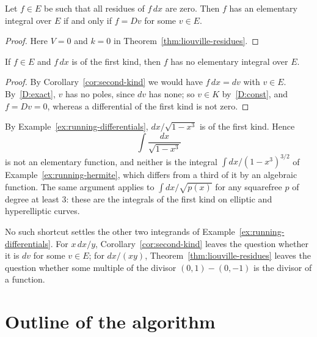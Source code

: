 \begin{corollary}\label{cor:second-kind}
Let $f \in E$ be such that all residues of $f\,dx$ are zero. Then $f$ has an
elementary integral over $E$ if and only if $f = Dv$ for some $v \in E$.
\end{corollary}

\begin{proof}
Here $V = 0$ and $k = 0$ in Theorem~\ref{thm:liouville-residues}.
\end{proof}

\begin{corollary}\label{cor:first-kind}
If $f \in E$ and $f\,dx$ is of the first kind, then $f$ has no elementary
integral over $E$.
\end{corollary}

\begin{proof}
By Corollary~\ref{cor:second-kind} we would have $f\,dx = dv$ with $v \in E$.
By~\ref{D:exact}, $v$ has no poles, since $dv$ has none; so $v \in K$
by~\ref{D:const}, and $f = Dv = 0$, whereas a differential of the first kind
is not zero.
\end{proof}

\begin{example}\label{ex:first-kind}
By Example~\ref{ex:running-differentials}, $dx/\sqrt{1 - x^3}$ is of the first
kind. Hence
\[
  \int \frac{dx}{\sqrt{1 - x^3}}
\]
is not an elementary function, and neither is the integral
$\int dx/(1 - x^3)^{3/2}$ of Example~\ref{ex:running-hermite}, which
differs from a third of it by an algebraic function. The same argument
applies to $\int dx/\sqrt{p(x)}$ for any squarefree $p$ of degree at least
$3$: these are the integrals of the first kind on elliptic and hyperelliptic
curves.
\end{example}

No such shortcut settles the other two integrands of
Example~\ref{ex:running-differentials}. For $x\,dx/y$,
Corollary~\ref{cor:second-kind} leaves the question whether it is $dv$ for
some $v \in E$; for $dx/(xy)$, Theorem~\ref{thm:liouville-residues} leaves the
question whether some multiple of the divisor $(0, 1) - (0, -1)$ is the
divisor of a function.

\section{Outline of the algorithm}\label{sec:liouville-outline}


